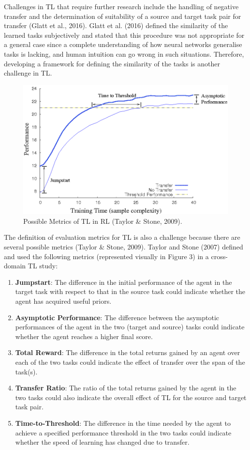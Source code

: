 Challenges in TL that require further research include the handling of negative transfer and the determination of suitability of a source and target task pair for transfer (Glatt et al., 2016). Glatt et al. (2016) defined the similarity of the learned tasks subjectively and stated that this procedure was not appropriate for a general case since a complete understanding of how neural networks generalise tasks is lacking, and human intuition can go wrong in such situations. Therefore, developing a framework for defining the similarity of the tasks is another challenge in TL.

\begin{figure}[]
	\includegraphics[width=\textwidth]{fig3.png} 
	\caption{Possible Metrics of TL in RL (Taylor \& Stone, 2009).}
\end{figure}

The definition of evaluation metrics for TL is also a challenge because there are several possible metrics (Taylor \& Stone, 2009).
Taylor and Stone (2007) defined and used the following metrics (represented visually in Figure 3) in a cross-domain TL study:
 \begin{enumerate}
	\item \textbf{Jumpstart}: The difference in the initial performance of the agent in the target task with respect to that in the source task could indicate whether the agent has acquired useful priors.
	\item \textbf{Asymptotic Performance}: The difference between the asymptotic performances of the agent in the two (target and source) tasks could indicate whether the agent reaches a higher final score.
	\item \textbf{Total Reward}: The difference in the total returns gained by an agent over each of the two tasks could indicate the effect of transfer over the span of the task(s).
	\item \textbf{Transfer Ratio}: The ratio of the total returns gained by the agent in the two tasks could also indicate the overall effect of TL for the source and target task pair.
	\item \textbf{Time-to-Threshold}: The difference in the time needed by the agent to achieve a specified performance threshold in the two tasks could indicate whether the speed of learning has changed due to transfer.
\end{enumerate}


